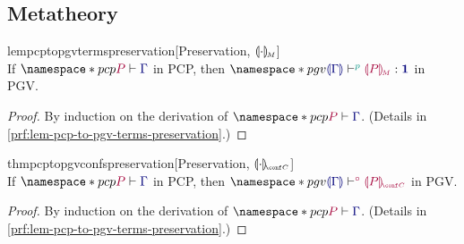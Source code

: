 \documentclass[main.tex]{subfiles}
\begin{document}
\subsection{Metatheory}

\begin{restatablelemma}{lempcptopgvtermspreservation}[Preservation, $\llparenthesis\cdot\rrparenthesis_{\!\scriptscriptstyle{M}}$]
  \label{lem:pcp-to-pgv-terms-preservation}
  \hfill\\%
  If $\pcp{\seq{P}{\ty{\Gamma}}}$ in PCP,
  then $\pgv{\tseq[\cs{p}]{\ty{\cpgvT{\Gamma}}}{\cpgvM{P}}{\tyunit}}$ in PGV.
\end{restatablelemma}
\begin{proof}
  By induction on the derivation of $\pcp{\seq{P}{\ty{\Gamma}}}$.
  (Details in \cref{prf:lem-pcp-to-pgv-terms-preservation}.)
\end{proof}

\begin{restatabletheorem}{thmpcptopgvconfspreservation}[Preservation, $\cpgvC{\cdot}$]
  \label{thm:pcp-to-pgv-confs-preservation}
  \hfill\\%
  If $\pcp{\seq{P}{\ty{\Gamma}}}$ in PCP,
  then $\pgv{\cseq[\child]{\ty{\cpgvT{\Gamma}}}{\cpgvC{P}}}$ in PGV.
\end{restatabletheorem}
\begin{proof}
  By induction on the derivation of $\pcp{\seq{P}{\ty{\Gamma}}}$.
  (Details in \cref{prf:lem-pcp-to-pgv-terms-preservation}.)

\end{proof}
\end{document}
